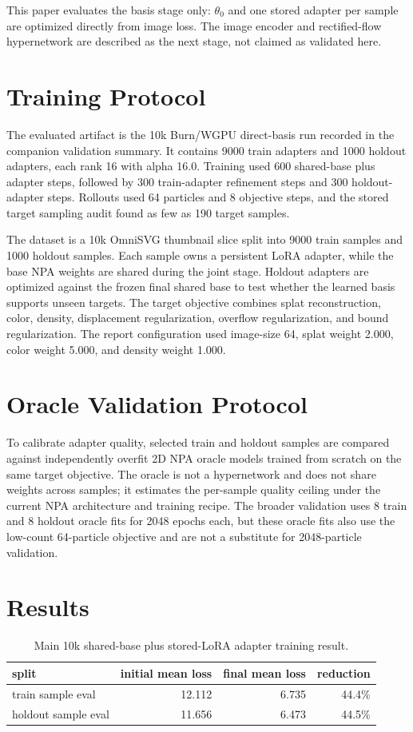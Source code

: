 \documentclass[10pt]{article}
\begin{document}
This paper evaluates the basis stage only: \(\theta_0\) and one stored adapter per sample are optimized directly from image loss. The image encoder and rectified-flow hypernetwork are described as the next stage, not claimed as validated here.

\section{Training Protocol}
The evaluated artifact is the 10k Burn/WGPU direct-basis run recorded in the companion validation summary. It contains 9000 train adapters and 1000 holdout adapters, each rank 16 with alpha 16.0. Training used 600 shared-base plus adapter steps, followed by 300 train-adapter refinement steps and 300 holdout-adapter steps. Rollouts used 64 particles and 8 objective steps, and the stored target sampling audit found as few as 190 target samples.

The dataset is a 10k OmniSVG thumbnail slice split into 9000 train samples and 1000 holdout samples. Each sample owns a persistent LoRA adapter, while the base NPA weights are shared during the joint stage. Holdout adapters are optimized against the frozen final shared base to test whether the learned basis supports unseen targets. The target objective combines splat reconstruction, color, density, displacement regularization, overflow regularization, and bound regularization. The report configuration used image-size 64, splat weight 2.000, color weight 5.000, and density weight 1.000.

\section{Oracle Validation Protocol}
To calibrate adapter quality, selected train and holdout samples are compared against independently overfit 2D NPA oracle models trained from scratch on the same target objective. The oracle is not a hypernetwork and does not share weights across samples; it estimates the per-sample quality ceiling under the current NPA architecture and training recipe. The broader validation uses 8 train and 8 holdout oracle fits for 2048 epochs each, but these oracle fits also use the low-count 64-particle objective and are not a substitute for 2048-particle validation.

\section{Results}
\begin{table}[h]
\centering
\begin{tabular}{lrrr}
\toprule
split & initial mean loss & final mean loss & reduction \\
\midrule
train sample eval & 12.112 & 6.735 & 44.4\% \\
holdout sample eval & 11.656 & 6.473 & 44.5\% \\
\bottomrule
\end{tabular}
\caption{Main 10k shared-base plus stored-LoRA adapter training result.}
\end{table}
\end{document}

